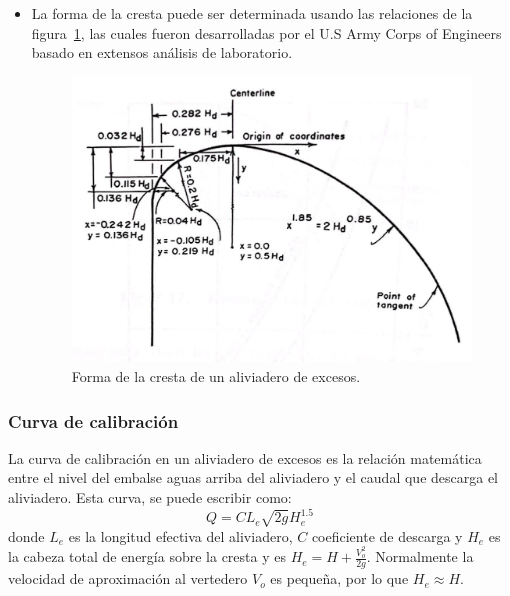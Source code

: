 \documentclass[11pt, oneside]{article}
\begin{document}
\begin{itemize}
\item La forma de la cresta puede ser determinada usando las relaciones de la figura~\ref{fig719}, las cuales fueron desarrolladas por el U.S Army Corps of Engineers basado en extensos an\'alisis de laboratorio. 
\begin{figure}[h]
    \centering
    \includegraphics[width=0.8\linewidth]{fig719.jpeg}
    \caption{Forma de la cresta de un aliviadero de excesos.}
    \label{fig719}
\end{figure}
\end{itemize}

\subsubsection{Curva de calibraci\'on}
La curva de calibraci\'on en un aliviadero de excesos es la relaci\'on matem\'atica entre el nivel del embalse aguas arriba del aliviadero y el caudal que descarga el aliviadero. Esta curva, se puede escribir como:
\begin{equation}
    Q = C L_e \sqrt{2g} H_e^{1.5}
    \label{eq26}
\end{equation}
donde $L_e$ es la longitud efectiva del aliviadero, $C$ coeficiente de descarga y $H_e$ es la cabeza total de energ\'ia sobre la cresta y es $H_e = H +\frac{V_o^2}{2g}$. Normalmente la velocidad de aproximaci\'on al vertedero $V_o$ es pequeña, por lo que $H_e \approx H$.
\end{document}
